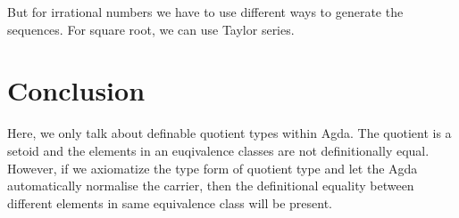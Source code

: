 \documentclass[a4paper,12pt]{article}
\begin{document}
But for irrational numbers we have to use different ways to generate the sequences. For square root, we can use Taylor series.

\section{Conclusion}
Here, we only talk about definable quotient types within Agda. The
quotient is a setoid and the elements in an euqivalence classes are
not definitionally equal. However, if we axiomatize the type form of
quotient type and let the Agda automatically normalise the carrier,
then the definitional equality between different elements in same
equivalence class will be present.



{}

\end{document}
